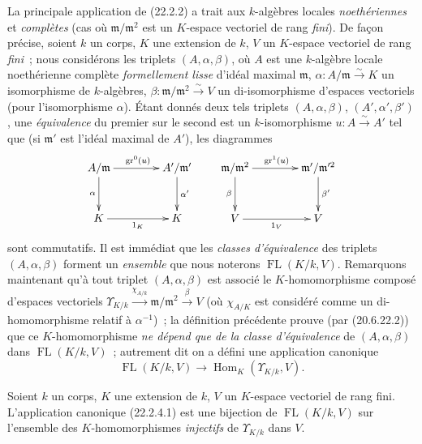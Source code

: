 \begin{env}[22.2.4]
\label{0.22.2.4-fr}
La principale application de (22.2.2) a trait aux $k$-algèbres locales
\emph{noethériennes} et \emph{complètes} (cas où $\mathfrak m/\mathfrak m^2$ est un
$K$-espace vectoriel de rang \emph{fini}). De façon précise, soient $k$ un
corps, $K$ une extension de $k$, $V$ un $K$-espace vectoriel de
rang \emph{fini}~; nous considérons les triplets $(A,\alpha,\beta)$, où $A$ est une
$k$-algèbre locale noethérienne complète \emph{formellement lisse} d'idéal
maximal $\mathfrak m$, $\alpha:A/\mathfrak m\xrightarrow{\sim}K$ un
isomorphisme de $k$-algèbres,
$\beta:\mathfrak m/\mathfrak m^2\xrightarrow{\sim}V$ un di-isomorphisme
d'espaces vectoriels (pour l'isomorphisme $\alpha$). Étant donnés deux tels
triplets $(A,\alpha,\beta)$, $(A',\alpha',\beta')$, une \emph{équivalence} du
premier sur le second est un $k$-isomorphisme $u:A\xrightarrow{\sim}A'$ tel
que (si $\mathfrak m'$ est l'idéal maximal de $A'$), les diagrammes
\[
\xymatrix@C=4em@R=3em{
  A/\mathfrak m \ar[r]^{\operatorname{gr}^0(u)} \ar[d]_{\alpha} &
  A'/\mathfrak m' \ar[d]^{\alpha'} \\
  K \ar[r]_{1_K} & K
}
\qquad
\xymatrix@C=4em@R=3em{
  \mathfrak m/\mathfrak m^2 \ar[r]^{\operatorname{gr}^1(u)}
    \ar[d]_{\beta} &
  \mathfrak m'/\mathfrak m'^2 \ar[d]^{\beta'} \\
  V \ar[r]_{1_V} & V
}
\]
sont commutatifs. Il est immédiat que les \emph{classes d'équivalence} des
triplets $(A,\alpha,\beta)$ forment un \emph{ensemble} que nous noterons
$\operatorname{FL}(K/k,V)$. Remarquons maintenant qu'à tout triplet
$(A,\alpha,\beta)$ est associé le $K$-homomorphisme composé d'espaces
vectoriels
$\Upsilon_{K/k}\xrightarrow{\chi_{A/k}}\mathfrak m/\mathfrak m^2\xrightarrow{\beta}V$
(où $\chi_{A/K}$ est considéré comme un di-homomorphisme relatif à
$\alpha^{-1}$)~; la définition précédente prouve (par (20.6.22.2)) que ce
$K$-homomorphisme \emph{ne dépend que de la classe d'équivalence} de
$(A,\alpha,\beta)$ dans $\operatorname{FL}(K/k,V)$~; autrement dit on a
défini une application canonique
\begin{equation}
\tag{22.2.4.1}
\label{0.22.2.4.1-fr}
  \operatorname{FL}(K/k,V)\longrightarrow
  \operatorname{Hom}_K(\Upsilon_{K/k},V).
\end{equation}
\end{env}

\begin{proposition}[22.2.5]
\label{0.22.2.5-fr}
Soient $k$ un corps, $K$ une extension de $k$, $V$ un $K$-espace vectoriel
de rang fini. L'application canonique \textup{(22.2.4.1)} est une bijection de
$\operatorname{FL}(K/k,V)$ sur l'ensemble des $K$-homomorphismes \emph{injectifs}
de $\Upsilon_{K/k}$ dans $V$.
\end{proposition}

